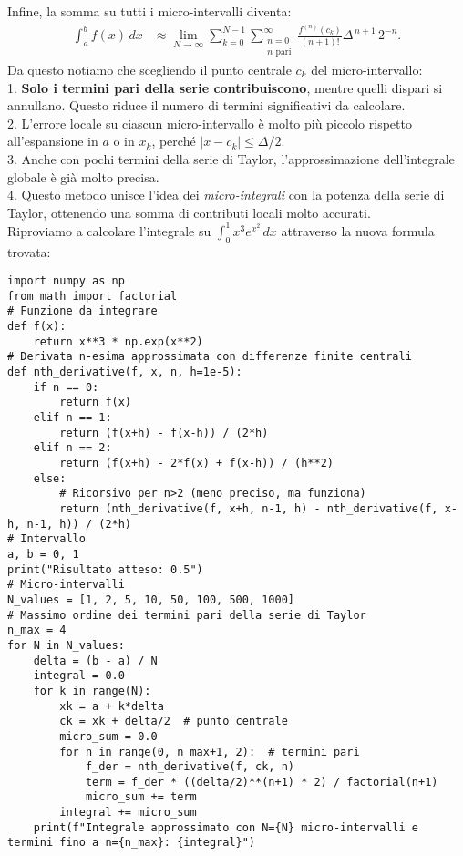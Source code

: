 \documentclass[10pt]{extarticle}
\begin{document}
Infine, la somma su tutti i micro-intervalli diventa:
\begin{align*}
\int_a^b f(x) \, dx &\approx \lim_{N \to \infty} \sum_{k=0}^{N-1} \sum_{\substack{n=0 \\ n \text{ pari}}}^{\infty} \frac{f^{(n)}(c_k)}{(n+1)!} \Delta^{\,n+1} \, 2^{-n}.
\end{align*}
Da questo notiamo che scegliendo il punto centrale \(c_k\) del micro-intervallo: \\
1. \textbf{Solo i termini pari della serie contribuiscono}, mentre quelli dispari si annullano. Questo riduce il numero di termini significativi da calcolare. \\
2. L'errore locale su ciascun micro-intervallo è molto più piccolo rispetto all'espansione in \(a\) o in \(x_k\), perché \(|x - c_k| \le \Delta/2\). \\
3. Anche con pochi termini della serie di Taylor, l'approssimazione dell'integrale globale è già molto precisa. \\
4. Questo metodo unisce l'idea dei \emph{micro-integrali} con la potenza della serie di Taylor, ottenendo una somma di contributi locali molto accurati. \\

Riproviamo a calcolare l'integrale su $\int_0^1 x^3 e^{x^2} \, dx$ attraverso la nuova formula trovata:
\begin{lstlisting}
import numpy as np
from math import factorial
# Funzione da integrare
def f(x):
    return x**3 * np.exp(x**2)
# Derivata n-esima approssimata con differenze finite centrali
def nth_derivative(f, x, n, h=1e-5):
    if n == 0:
        return f(x)
    elif n == 1:
        return (f(x+h) - f(x-h)) / (2*h)
    elif n == 2:
        return (f(x+h) - 2*f(x) + f(x-h)) / (h**2)
    else:
        # Ricorsivo per n>2 (meno preciso, ma funziona)
        return (nth_derivative(f, x+h, n-1, h) - nth_derivative(f, x-h, n-1, h)) / (2*h)
# Intervallo
a, b = 0, 1
print("Risultato atteso: 0.5")
# Micro-intervalli
N_values = [1, 2, 5, 10, 50, 100, 500, 1000]
# Massimo ordine dei termini pari della serie di Taylor
n_max = 4
for N in N_values:
    delta = (b - a) / N
    integral = 0.0
    for k in range(N):
        xk = a + k*delta
        ck = xk + delta/2  # punto centrale
        micro_sum = 0.0
        for n in range(0, n_max+1, 2):  # termini pari
            f_der = nth_derivative(f, ck, n)
            term = f_der * ((delta/2)**(n+1) * 2) / factorial(n+1)
            micro_sum += term
        integral += micro_sum
    print(f"Integrale approssimato con N={N} micro-intervalli e termini fino a n={n_max}: {integral}")
\end{lstlisting}
\end{document}
